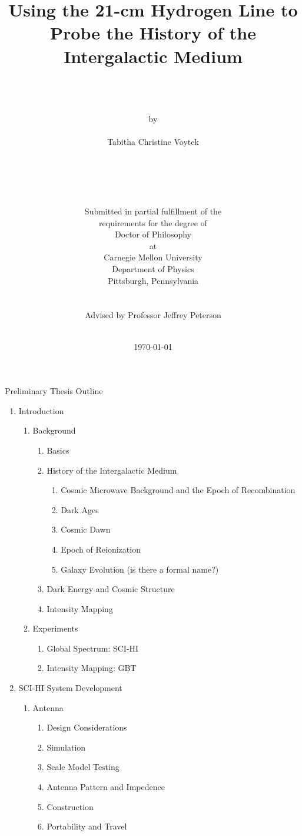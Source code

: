 \documentclass[12pt,twoside]{report}
\author{\\
	\\
	\\
	by \\
	\\
      	Tabitha Christine Voytek \\
	\\
	\\
	\\
	\\
	\\
        Submitted in partial fulfillment of the \\
        requirements for the degree of \\
        Doctor of Philosophy \\
        at \\
        Carnegie Mellon University \\
        Department of Physics \\
        Pittsburgh, Pennsylvania \\
	\\
        \\
	Advised by Professor Jeffrey Peterson
	\\
	\\
}
\title{\bf{
Using the 21-cm Hydrogen Line to Probe the History of the Intergalactic Medium 
}}
\date{\today}
\begin{document}
Preliminary Thesis Outline

\begin{enumerate}
\item Introduction

\begin{enumerate}
\item Background 

\begin{enumerate}
\item \cm Basics
\item History of the Intergalactic Medium

\begin{enumerate}
\item Cosmic Microwave Background and the Epoch of Recombination
\item Dark Ages
\item Cosmic Dawn
\item Epoch of Reionization
\item Galaxy Evolution (is there a formal name?)
\end{enumerate}

\item Dark Energy and Cosmic Structure
\item Intensity Mapping
\end{enumerate}

\item Experiments

\begin{enumerate}
\item Global \cm Spectrum: SCI-HI
\item \cm Intensity Mapping: GBT 
\end{enumerate}

\end{enumerate}

\item SCI-HI System Development

\begin{enumerate}
\item Antenna

\begin{enumerate}
\item Design Considerations
\item Simulation
\item Scale Model Testing
\item Antenna Pattern and Impedence
\item Construction
\item Portability and Travel
\end{enumerate}


\end{enumerate}
\end{enumerate}
\end{document}
